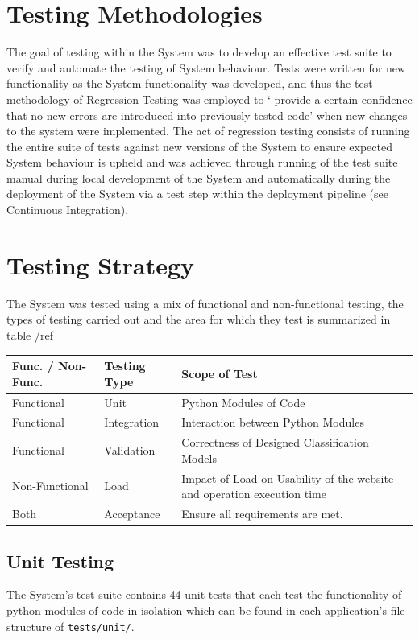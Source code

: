 \documentclass[11pt]{report}
\begin{document}
\section{Testing Methodologies}
The goal of testing within the System was to develop an effective test suite to verify and automate the testing of System behaviour. Tests were written for new functionality as the System functionality was developed, and thus the test methodology of Regression Testing was employed to ` provide a certain confidence that no new errors are introduced into previously tested code' \citep{MucciniSoftwarearchitecturebasedregression2006} when new changes to the system were implemented. The act of regression testing consists of running the entire suite of tests against new versions of the System to ensure expected System behaviour is upheld and was achieved through running of the test suite manual during local development of the System and automatically during the deployment of the System via a test step within the deployment pipeline (see Continuous Integration).

\section{Testing Strategy}
The System was tested using a mix of functional and non-functional testing, the types of testing carried out and the area for which they test is summarized in table /ref

\begin{center}
\begin{tabular}{ |p{3.5cm}||p{3.5cm}|p{7cm}|}
\hline
 Func. / Non-Func. & Testing Type & Scope of Test \\
 \hline
 Functional & Unit & Python Modules of Code\\
 \hline
 Functional & Integration & Interaction between Python Modules\\
 \hline
Functional & Validation & Correctness of Designed Classification Models\\
 \hline
Non-Functional & Load & Impact of Load on Usability of the website and operation execution time\\
 \hline
 Both & Acceptance & Ensure all requirements are met.\\
 \hline
\end{tabular}
\label{table:naive-results}
\end{center}

\subsection*{Unit Testing}
The System's test suite contains 44 unit tests that each test the functionality of python modules of code in isolation which can be found in each application's file structure of \texttt{tests/unit/}.
\end{document}
